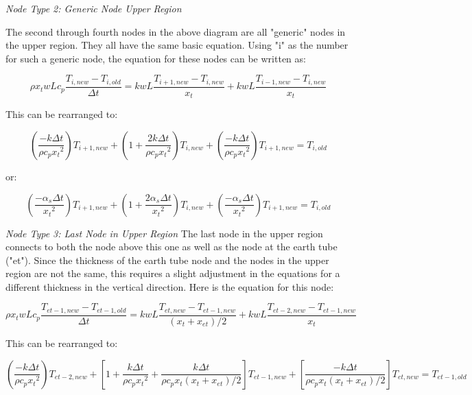 \emph{\textit{Node Type 2: Generic Node Upper Region}}

The second through fourth nodes in the above diagram are all "generic" nodes in the upper region.  They all have the same basic equation.  Using "i" as the number for such a generic node, the equation for these nodes can be written as:

\begin{equation}
\rho x_t w L c_p \frac{T_{i,new} - T_{i,old}}{\Delta t} = k w L \frac{T_{i+1,new}-T_{i,new}}{x_t} + k w L \frac{T_{i-1,new}-T_{i,new}}{x_t}
\end{equation}

This can be rearranged to:

\begin{equation}
(\frac{-k \Delta t}{\rho c_p {x_t}^2}) T_{i+1,new} + (1 + \frac{2 k \Delta t}{\rho c_p {x_t}^2}) T_{i,new} + (\frac{-k \Delta t}{\rho c_p {x_t}^2}) T_{i+1,new} = T_{i,old}
\end{equation}

or:

\begin{equation}
(\frac{-\alpha_s \Delta t}{{x_t}^2}) T_{i+1,new} + (1 + \frac{2 \alpha_s \Delta t}{{x_t}^2}) T_{i,new} + (\frac{-\alpha_s \Delta t}{{x_t}^2}) T_{i+1,new} = T_{i,old}
\end{equation}


\emph{\textit{Node Type 3: Last Node in Upper Region}}
The last node in the upper region connects to both the node above this one as well as the node at the earth tube ("et").  Since the thickness of the earth tube node and the nodes in the upper region are not the same, this requires a slight adjustment in the equations for a different thickness in the vertical direction.  Here is the equation for this node:

\begin{equation}
\rho x_t w L c_p \frac{T_{et-1,new} - T_{et-1,old}}{\Delta t} = k w L \frac{T_{et,new}-T_{et-1,new}}{(x_t + x_{et})/2} + k w L \frac{T_{et-2,new}-T_{et-1,new}}{x_t}
\end{equation}

This can be rearranged to:

\begin{equation}
(\frac{-k \Delta t}{\rho c_p {x_t}^2}) T_{et-2,new} + [1 + \frac{k \Delta t}{\rho c_p {x_t}^2} + \frac{k \Delta t}{\rho c_p x_t (x_t+x_{et})/2}] T_{et-1,new} + [\frac{-k \Delta t}{\rho c_p x_t (x_t+x_{et})/2}] T_{et,new} = T_{et-1,old}
\end{equation}

